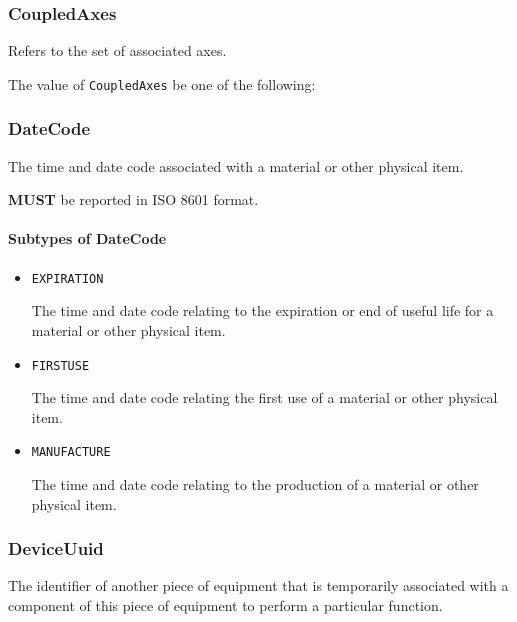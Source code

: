 \subsubsection{CoupledAxes}
\label{sec:CoupledAxes}



Refers to the set of associated axes.


The value of \texttt{CoupledAxes} \MUST be one of the following: 

\FloatBarrier

\subsubsection{DateCode}
\label{sec:DateCode}



The time and date code associated with a material or other physical item.
  
  \textbf{MUST} be reported in ISO 8601 format.


\paragraph{Subtypes of DateCode}\mbox{}
\label{sec:Subtypes of DateCode}

\begin{itemize}

\item \texttt{EXPIRATION}


The time and date code relating to the expiration or end of useful life for a material or other physical item.

\item \texttt{FIRST\textunderscore USE}


The time and date code relating the first use of a material or other physical item.

\item \texttt{MANUFACTURE}


The time and date code relating to the production of a material or other physical item.


\end{itemize}

\subsubsection{DeviceUuid}
\label{sec:DeviceUuid}



The identifier of another piece of equipment that is temporarily associated with a component of this piece of equipment to perform a particular function.
  
